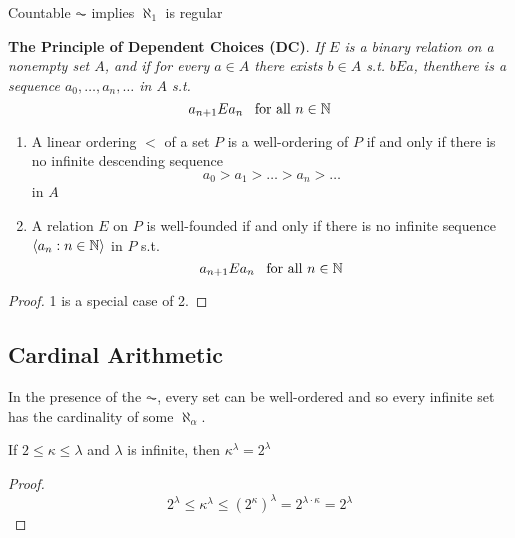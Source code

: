 \documentclass[11pt]{article}
\begin{document}
\begin{proposition}[]
Countable \(\AC\) implies \(\aleph_1\) is regular
\end{proposition}


\textbf{The Principle of Dependent Choices (DC)}. \emph{If \(E\) is a binary relation on a}
\emph{nonempty set \(A\), and if for every \(a\in A\) there exists \(b\in A\) s.t.}
\emph{\(bEa\), thenthere is a sequence \(a_0,\dots,a_n,\dots\) in \(A\) s.t.}
\begin{equation*}
a_{n+1}Ea_n\enspace\text{ for all }n\in\mathbb{N}
\end{equation*}


\begin{lemma}[]
\begin{enumerate}
\item A linear ordering \(<\) of a set \(P\) is a well-ordering of \(P\) if and only
if there is no infinite descending sequence 
\begin{equation*}
a_0>a_1>\dots>a_n>\dots
\end{equation*}
in \(A\)
\item A relation \(E\) on \(P\) is well-founded if and only if there is no infinite
sequence \(\langle a_n:n\in\mathbb{N}\rangle\) in \(P\) s.t.
\begin{equation*}
a_{n+1}Ea_n\enspace\text{ for all }n\in\mathbb{N}
\end{equation*}
\end{enumerate}
\end{lemma}

\begin{proof}
1 is a special case of 2.
\end{proof}


\subsection{Cardinal Arithmetic}
\label{sec:org7c8650c}
In the presence of the \(\AC\), every set can be well-ordered and so every
infinite set has the cardinality of some \(\aleph_\alpha\).

\begin{lemma}[]
If \(2\le\kappa\le\lambda\) and \(\lambda\) is infinite, then \(\kappa^\lambda=2^\lambda\)
\end{lemma}
\begin{proof}
\begin{equation*}
2^\lambda\le\kappa^\lambda\le(2^\kappa)^\lambda=2^{\lambda\cdot\kappa}=2^\lambda
\end{equation*}
\end{proof}
\end{document}
